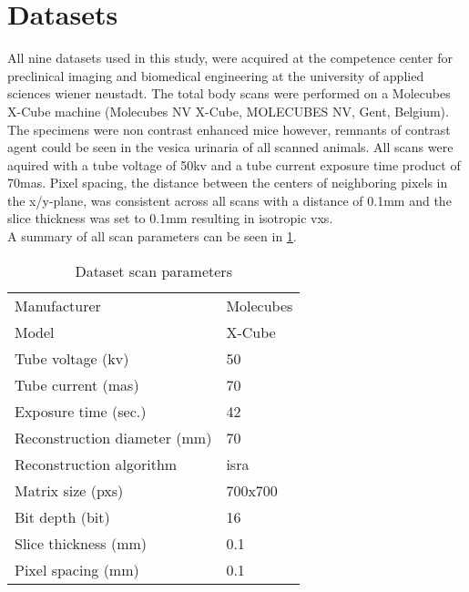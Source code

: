 \section{Datasets}
\label{s:datasets}
All nine datasets used in this study, were acquired at the competence center for preclinical imaging and biomedical engineering at the university of applied sciences wiener neustadt.
The total body scans were performed on a Molecubes X-Cube \mct\space machine (Molecubes NV X-Cube, MOLECUBES NV, Gent, Belgium).
The specimens were non contrast enhanced mice however, remnants of contrast agent could be seen in the vesica urinaria of all scanned animals.
All scans were aquired with a tube voltage of 50\acrshort{kv} and a tube current exposure time product of 70\acrshort{mas}.
Pixel spacing, the distance between the centers of neighboring pixels in the x/y-plane, was consistent across all scans with a distance of 0.1mm and the slice thickness was set to 0.1mm resulting in isotropic \glspl{vx}.\\
A summary of all scan parameters can be seen in \cref{tab:scan-parameters}.\\
\begin{table}
	\begin{center}
		\begin{tabular}{l l}
			Manufacturer                  & Molecubes  \\
			Model                         & X-Cube     \\
			Tube voltage (\acrshort{kv})  & 50         \\
			Tube current (\acrshort{mas}) & 70         \\
			Exposure time (sec.)          & 42         \\
			Reconstruction diameter (mm)  & 70         \\
			Reconstruction algorithm      & \gls{isra} \\
			Matrix size (\glspl{px})      & 700x700    \\
			Bit depth (\gls{bit})         & 16         \\
			Slice thickness (mm)          & 0.1        \\
			Pixel spacing (mm)            & 0.1        \\
		\end{tabular}
		\caption{Dataset scan parameters}
		\label{tab:scan-parameters}
	\end{center}
\end{table}

